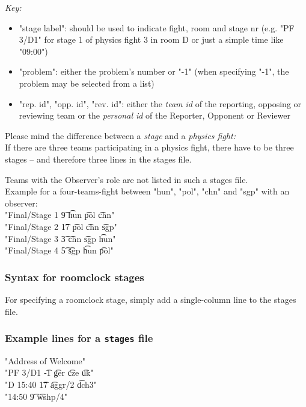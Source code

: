 \documentclass[11pt]{ltxdoc}
\begin{document}
    \bigskip
    \textit{Key:}
    \begin{itemize}
        \item
            "stage label": should be used to indicate fight, room and stage nr (e.g. "PF 3/D1" for stage 1 of physics fight 3 in room D or just a simple time like "09:00")
        \item
            "problem": either the problem's number or "-1" (when specifying "-1", the problem may be selected from a list)
 
        \item
            "rep. id", "opp. id", "rev. id": either the \textit{team id} of the reporting, opposing or reviewing team or the \textit{personal id} of the Reporter, Opponent or Reviewer
    \end{itemize}
    
    \medskip
    Please mind the difference between a \textit{stage} and a \textit{physics fight:} \\
    If there are three teams participating in a physics fight, there have to be three stages -- and therefore three lines in the stages file.
    
    \bigskip
    Teams with the Observer's role are not listed in such a stages file. \\
    Example for a four-teams-fight between "hun", "pol", "chn" and "sgp" with an observer: \\[\smallskipamount]
    "Final/Stage 1  \t  9   \t  hun  \t  pol  \t  chn" \\
    "Final/Stage 2  \t  17  \t  pol  \t  chn  \t  sgp" \\
    "Final/Stage 3  \t  3   \t  chn  \t  sgp  \t  hun" \\
    "Final/Stage 4  \t  5   \t  sgp  \t  hun  \t  pol" 
    
    
    
    \subsubsection*{Syntax for roomclock stages}
    For specifying a roomclock stage, simply add a single-column line to the stages file.
    
    
    \subsubsection*{Example lines for a \texttt{stages} file}
    "Address of Welcome" \\
    "PF 3/D1  \t  -1  \t  ger     \t  cze   \t  uk" \\
    "D 15:40  \t  17  \t  aggr/2  \t  dch3" \\
    "14:50    \t  9   \t  wshp/4" 
    
\end{document}
